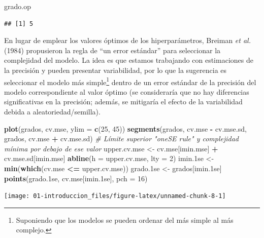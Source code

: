\documentclass[]{book}
\newenvironment{Shaded}{\begin{snugshade}}{\end{snugshade}}
\newcommand{\KeywordTok}[1]{\textcolor[rgb]{0.13,0.29,0.53}{\textbf{#1}}}
\newcommand{\DataTypeTok}[1]{\textcolor[rgb]{0.13,0.29,0.53}{#1}}
\newcommand{\DecValTok}[1]{\textcolor[rgb]{0.00,0.00,0.81}{#1}}
\newcommand{\StringTok}[1]{\textcolor[rgb]{0.31,0.60,0.02}{#1}}
\newcommand{\CommentTok}[1]{\textcolor[rgb]{0.56,0.35,0.01}{\textit{#1}}}
\newcommand{\OperatorTok}[1]{\textcolor[rgb]{0.81,0.36,0.00}{\textbf{#1}}}
\newcommand{\NormalTok}[1]{#1}
\theoremstyle{break}
\theoremstyle{definition}
\theoremstyle{definition}
\theoremstyle{definition}
\theoremstyle{remark}
\begin{document}
\begin{Shaded}
\begin{Highlighting}[]
\NormalTok{grado.op}
\end{Highlighting}
\end{Shaded}

\begin{verbatim}
## [1] 5
\end{verbatim}

En lugar de emplear los valores óptimos de los hiperparámetros, Breiman
\emph{et al.} (1984) propusieron la regla de ``un error estándar'' para
seleccionar la complejidad del modelo. La idea es que estamos trabajando
con estimaciones de la precisión y pueden presentar variabilidad, por lo
que la sugerencia es seleccionar el modelo más simple\footnote{Suponiendo
  que los modelos se pueden ordenar del más simple al más complejo.}
dentro de un error estándar de la precisión del modelo correspondiente
al valor óptimo (se consideraría que no hay diferencias significativas
en la precisión; además, se mitigaría el efecto de la variabilidad
debida a aleatoriedad/semilla).

\begin{Shaded}
\begin{Highlighting}[]
\KeywordTok{plot}\NormalTok{(grados, cv.mse, }\DataTypeTok{ylim =} \KeywordTok{c}\NormalTok{(}\DecValTok{25}\NormalTok{, }\DecValTok{45}\NormalTok{))}
\KeywordTok{segments}\NormalTok{(grados, cv.mse }\OperatorTok{-}\StringTok{ }\NormalTok{cv.mse.sd, grados, cv.mse }\OperatorTok{+}\StringTok{ }\NormalTok{cv.mse.sd)}
\CommentTok{# Límite superior "oneSE rule" y complejidad mínima por debajo de ese valor}
\NormalTok{upper.cv.mse <-}\StringTok{ }\NormalTok{cv.mse[imin.mse] }\OperatorTok{+}\StringTok{ }\NormalTok{cv.mse.sd[imin.mse]}
\KeywordTok{abline}\NormalTok{(}\DataTypeTok{h =}\NormalTok{ upper.cv.mse, }\DataTypeTok{lty =} \DecValTok{2}\NormalTok{)}
\NormalTok{imin.1se <-}\StringTok{ }\KeywordTok{min}\NormalTok{(}\KeywordTok{which}\NormalTok{(cv.mse }\OperatorTok{<=}\StringTok{ }\NormalTok{upper.cv.mse))}
\NormalTok{grado.1se <-}\StringTok{ }\NormalTok{grados[imin.1se]}
\KeywordTok{points}\NormalTok{(grado.1se, cv.mse[imin.1se], }\DataTypeTok{pch =} \DecValTok{16}\NormalTok{)}
\end{Highlighting}
\end{Shaded}

\begin{center}\texttt{[image: 01-introduccion\_files/figure-latex/unnamed-chunk-8-1]} \end{center}
\end{document}
